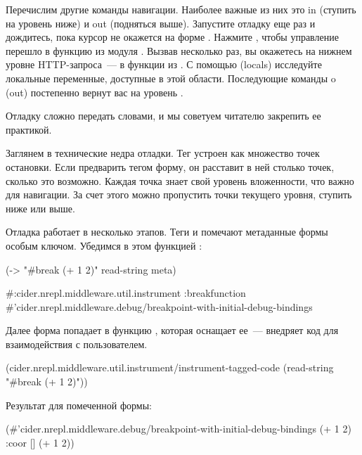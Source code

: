 Перечислим другие команды навигации. Наиболее важные из них это in (ступить на уровень ниже) и out (подняться выше). Запустите отладку еще раз и дождитесь, пока курсор не окажется на форме . Нажмите , чтобы управление перешло в функцию  из модуля . Вызвав  несколько раз, вы окажетесь на нижнем уровне HTTP-запроса~--- в функции  из . С помощью  (locals) исследуйте локальные переменные, доступные в этой области. Последующие команды o (out) постепенно вернут вас на уровень .

Отладку сложно передать словами, и мы советуем читателю закрепить ее практикой.

Заглянем в технические недра отладки. Тег  устроен как множество точек остановки. Если предварить тегом форму, он расставит в ней столько точек, сколько это возможно. Каждая точка знает свой уровень вложенности, что важно для навигации. За счет этого можно пропустить точки текущего уровня, ступить ниже или выше.

Отладка работает в несколько этапов. Теги  и  помечают метаданные формы особым ключом. Убедимся в этом функцией :

\begin{english}
  \begin{clojure}
(-> "#break (+ 1 2)"
    read-string
    meta)

#:cider.nrepl.middleware.util.instrument
{:breakfunction
 #'cider.nrepl.middleware.debug/breakpoint-with-initial-debug-bindings}
  \end{clojure}
\end{english}

Далее форма попадает в функцию , которая оснащает ее~--- внедряет код для взаимодействия с пользователем.

\begin{english}
  \begin{clojure}
(cider.nrepl.middleware.util.instrument/instrument-tagged-code
 (read-string "#break (+ 1 2)"))
  \end{clojure}
\end{english}

Результат для помеченной формы:

\begin{english}
  \begin{clojure}
(#'cider.nrepl.middleware.debug/breakpoint-with-initial-debug-bindings
 (+ 1 2)
 {:coor []}
 (+ 1 2))
  \end{clojure}
\end{english}

